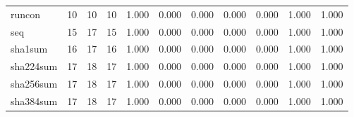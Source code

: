 \begin{longtable}{lp{1.2cm}p{1.2cm}p{1.2cm}p{1.2cm}p{1.2cm}p{1.2cm}p{1.2cm}p{1.2cm}p{1.2cm}p{1.2cm}}
runcon    &                           10 &                 10 &                                10 &                                      1.000 &                                  0.000 &                                        0.000 &                             0.000 &                                   0.000 &                              1.000 &                                              1.000 \\
seq       &                           15 &                 17 &                                15 &                                      1.000 &                                  0.000 &                                        0.000 &                             0.000 &                                   0.000 &                              1.000 &                                              1.000 \\
sha1sum   &                           16 &                 17 &                                16 &                                      1.000 &                                  0.000 &                                        0.000 &                             0.000 &                                   0.000 &                              1.000 &                                              1.000 \\
sha224sum &                           17 &                 18 &                                17 &                                      1.000 &                                  0.000 &                                        0.000 &                             0.000 &                                   0.000 &                              1.000 &                                              1.000 \\
sha256sum &                           17 &                 18 &                                17 &                                      1.000 &                                  0.000 &                                        0.000 &                             0.000 &                                   0.000 &                              1.000 &                                              1.000 \\
sha384sum &                           17 &                 18 &                                17 &                                      1.000 &                                  0.000 &                                        0.000 &                             0.000 &                                   0.000 &                              1.000 &                                              1.000 \\

\end{longtable}
